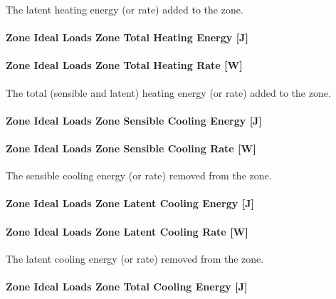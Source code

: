 The latent heating energy (or rate) added to the zone.

\paragraph{Zone Ideal Loads Zone Total Heating Energy {[}J{]}}\label{zone-ideal-loads-zone-total-heating-energy-j}

\paragraph{Zone Ideal Loads Zone Total Heating Rate {[}W{]}}\label{zone-ideal-loads-zone-total-heating-rate-w}

The total (sensible and latent) heating energy (or rate) added to the zone.

\paragraph{Zone Ideal Loads Zone Sensible Cooling Energy {[}J{]}}\label{zone-ideal-loads-zone-sensible-cooling-energy-j}

\paragraph{Zone Ideal Loads Zone Sensible Cooling Rate {[}W{]}}\label{zone-ideal-loads-zone-sensible-cooling-rate-w}

The sensible cooling energy (or rate) removed from the zone.

\paragraph{Zone Ideal Loads Zone Latent Cooling Energy {[}J{]}}\label{zone-ideal-loads-zone-latent-cooling-energy-j}

\paragraph{Zone Ideal Loads Zone Latent Cooling Rate {[}W{]}}\label{zone-ideal-loads-zone-latent-cooling-rate-w}

The latent cooling energy (or rate) removed from the zone.

\paragraph{Zone Ideal Loads Zone Total Cooling Energy {[}J{]}}\label{zone-ideal-loads-zone-total-cooling-energy-j}

